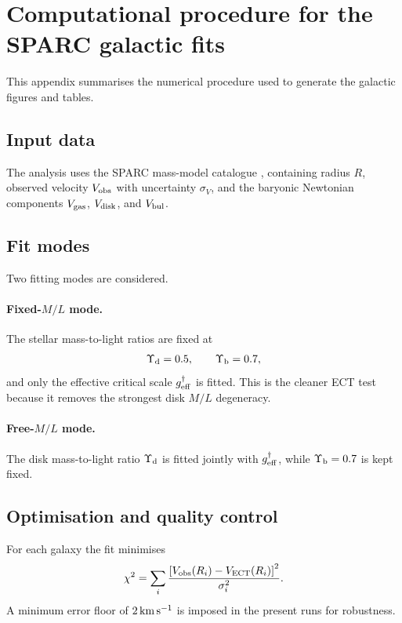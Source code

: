 \documentclass[11pt,a4paper]{article}
\numberwithin{equation}{section}
\begin{document}
\section{Computational procedure for the SPARC galactic fits}
\label{app:sparc_computation}

This appendix summarises the numerical procedure used to generate the
galactic figures and tables.

\subsection{Input data}

The analysis uses the SPARC mass-model catalogue
\cite{Lelli2016SPARC}, containing radius $R$, observed velocity
$V_{\rm obs}$ with uncertainty $\sigma_V$, and the baryonic Newtonian
components $V_{\rm gas}$, $V_{\rm disk}$, and $V_{\rm bul}$.

\subsection{Fit modes}

Two fitting modes are considered.

\paragraph{Fixed-$M/L$ mode.}
The stellar mass-to-light ratios are fixed at
\[
\Upsilon_{\rm d}=0.5,\qquad \Upsilon_{\rm b}=0.7,
\]
and only the effective critical scale $g^\dagger_{\rm eff}$ is fitted.
This is the cleaner ECT test because it removes the strongest disk
$M/L$ degeneracy.

\paragraph{Free-$M/L$ mode.}
The disk mass-to-light ratio $\Upsilon_{\rm d}$ is fitted jointly with
$g^\dagger_{\rm eff}$, while $\Upsilon_{\rm b}=0.7$ is kept fixed.

\subsection{Optimisation and quality control}

For each galaxy the fit minimises
\begin{equation}
\chi^2 = \sum_i
\frac{\left[V_{\rm obs}(R_i)-V_{\rm ECT}(R_i)\right]^2}{\sigma_i^2}.
\end{equation}
A minimum error floor of $2\,{\rm km\,s^{-1}}$ is imposed in the present
runs for robustness.
\end{document}
